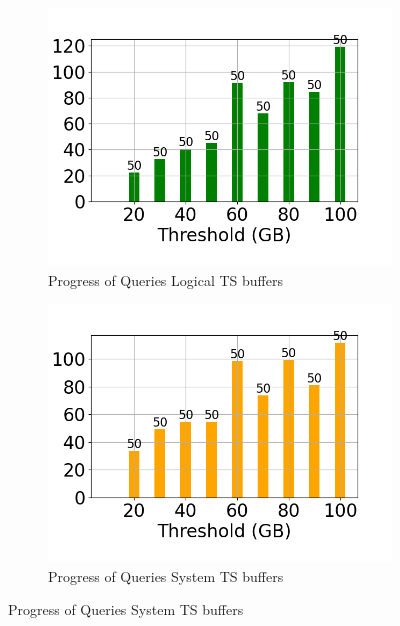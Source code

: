 \begin{figure}
	\centering
	\begin{subfigure}[c]{0.4\textwidth}
		\includegraphics[width=1\textwidth]   {figures/Experiments/Dynamic/Progress/7/average_query_time_per_batch_version_999777015_10485760_10_delay[7].png}
		\caption{Progress of Queries Logical TS buffers}
		\label{fig:progress-queries-7-logical}
	\end{subfigure}
	\begin{subfigure}[c]{0.4\textwidth}
		\includegraphics[width=1\textwidth]   {figures/Experiments/Dynamic/Progress/7/average_query_time_per_batch_version_999777018_10485760_10_delay[7].png}
		\caption{Progress of Queries System TS buffers}

\end{subfigure}
\end{figure}
